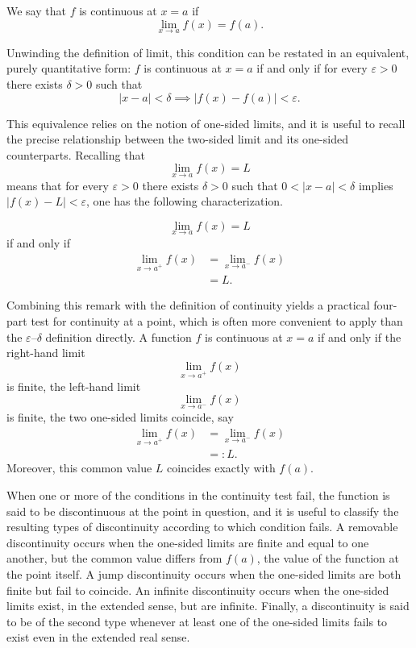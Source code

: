 \begin{definition}
We say that $f$ is continuous at $x = a$ if
\[
\lim_{x \to a} f(x) = f(a).
\]

\end{definition}

Unwinding the definition of limit, this condition can be restated in an equivalent, purely quantitative form: $f$ is continuous at $x = a$ if and only if for every $\varepsilon > 0$ there exists $\delta > 0$ such that
\[
|x - a| < \delta \implies |f(x) - f(a)| < \varepsilon.
\]

This equivalence relies on the notion of one-sided limits, and it is useful to recall the precise relationship between the two-sided limit and its one-sided counterparts. Recalling that \[
\lim_{x \to a} f(x) = L
\] means that for every $\varepsilon > 0$ there exists $\delta > 0$ such that $0 < |x-a| < \delta$ implies $|f(x) - L| < \varepsilon$, one has the following characterization.

\begin{remark}

\[
\lim_{x \to a} f(x) = L
\]
if and only if
\[
\begin{aligned}
\lim_{x \to a^+} f(x) &= \lim_{x \to a^-} f(x) \\
&= L.
\end{aligned}
\]

\end{remark}

Combining this remark with the definition of continuity yields a practical four-part test for continuity at a point, which is often more convenient to apply than the $\varepsilon$--$\delta$ definition directly. A function $f$ is continuous at $x = a$ if and only if the right-hand limit \[
\lim_{x \to a^+} f(x)
\] is finite, the left-hand limit \[
\lim_{x \to a^-} f(x)
\] is finite, the two one-sided limits coincide, say
\[
\begin{aligned}
\lim_{x \to a^+} f(x) &= \lim_{x \to a^-} f(x) \\
&= : L.
\end{aligned}
\]
Moreover, this common value $L$ coincides exactly with $f(a)$.


When one or more of the conditions in the continuity test fail, the function is said to be discontinuous at the point in question, and it is useful to classify the resulting types of discontinuity according to which condition fails. A removable discontinuity occurs when the one-sided limits are finite and equal to one another, but the common value differs from $f(a)$, the value of the function at the point itself. A jump discontinuity occurs when the one-sided limits are both finite but fail to coincide. An infinite discontinuity occurs when the one-sided limits exist, in the extended sense, but are infinite. Finally, a discontinuity is said to be of the second type whenever at least one of the one-sided limits fails to exist even in the extended real sense.

